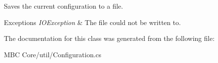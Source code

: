 Saves the current configuration to a file.


\begin{DoxyExceptions}{Exceptions}
{\em I\-O\-Exception} & The file could not be written to.\\
\hline
\end{DoxyExceptions}


The documentation for this class was generated from the following file\-:\begin{DoxyCompactItemize}
\item 
M\-B\-C Core/util/Configuration.\-cs\end{DoxyCompactItemize}
